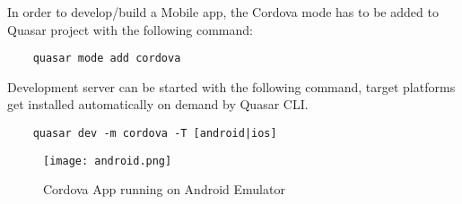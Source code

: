 In order to develop/build a Mobile app, the Cordova mode has to be added to Quasar project with the following command: 

\begin{verbatim}
    quasar mode add cordova
\end{verbatim}

Development server can be started with the following command, target platforms get installed automatically on demand by Quasar CLI.

\begin{verbatim}
    quasar dev -m cordova -T [android|ios]
\end{verbatim}

\begin{figure}[H]
    \centering
    \texttt{[image: android.png]}
    \caption[Cordova App running on Android Emulator]{\label{fig:android} Cordova App running on Android Emulator }
\end{figure}